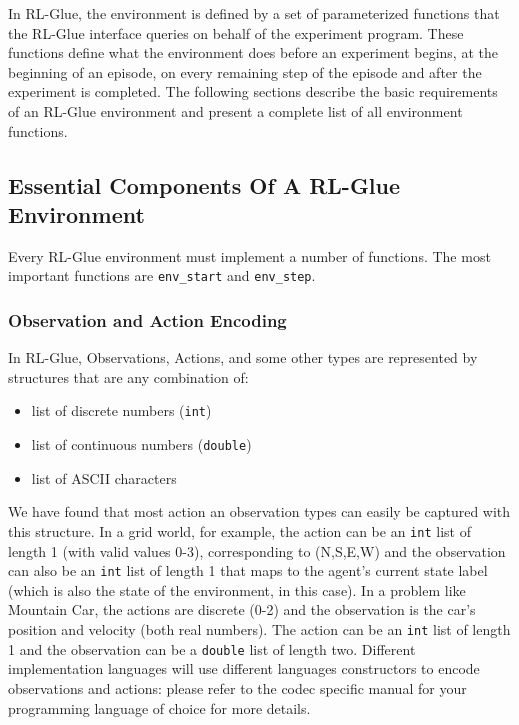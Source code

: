 \documentclass[11pt]{article}
\begin{document}
In RL-Glue, the environment is defined by a set of parameterized functions that the RL-Glue interface queries on behalf of the experiment program. These functions define what the environment does before an experiment begins, at the beginning of an episode, on every remaining step of the episode and after the experiment is completed. The following sections describe the basic requirements of an RL-Glue environment and present a complete list of all environment functions.

\subsection{Essential Components Of A RL-Glue Environment}
\label{envp1}

Every RL-Glue environment must implement a number of functions.  The most important functions are \texttt{env\_start} and \texttt{env\_step}.   

\subsubsection{Observation and Action Encoding}
In RL-Glue, Observations, Actions, and some other types are represented by structures that are any combination of:
\begin{itemize}
\item list of discrete numbers (\texttt{int})
\item list of continuous numbers (\texttt{double})
\item list of ASCII characters
\end{itemize}

We have found that most action an observation types can easily be captured with this structure.  In a grid world, for example, the action can be an \texttt{int} list of length 1 (with valid values 0-3), corresponding to (N,S,E,W) and the observation can also be an \texttt{int} list of length 1 that maps to the agent's current state label (which is also the state of the environment, in this case). In a problem like Mountain Car, the actions are discrete (0-2) and the observation is the car's position and velocity (both real numbers). The action can be an \texttt{int} list of length 1 and the observation can be a \texttt{double} list of length two. Different implementation languages will use different languages constructors to encode observations and actions: please refer to the codec specific manual for your programming language of  choice for more details.
\end{document}
